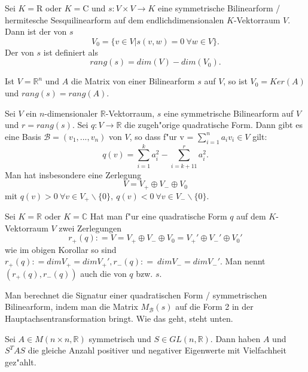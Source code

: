 \documentclass[9pt, a4paper, twocolumn, landscape]{article}
\begin{document}
\begin{definition} Sei $K = \mathrm{R}$ oder $K = \mathrm{C}$ und  $s : V \times V \rightarrow K$ eine symmetrische Bilinearform / hermitesche Sesquilinearform auf dem endlichdimensionalen $K$-Vektorraum $V$. Dann ist der  von $s$ 
$$
V_0 = \{ v \in V | s(v, w) = 0 \ \forall w \in V \}.
$$
Der  von $s$ ist definiert als
$$
rang(s) = dim (V) - dim (V_0).
$$
\end{definition}

\begin{remark} Ist $V = \mathbb{R}^n$ und $A$ die Matrix von einer Bilinearform $s$ auf $V$, so ist $V_0 = Ker(A)$ und $rang(s) = rang(A)$.
\end{remark}

\begin{corollary}
Sei $V$ ein $n$-dimensionaler $\mathbb{R}$-Vektorraum, $s$ eine symmetrische Bilinearform auf $V$ und $r = rang(s)$. Sei $q : V \rightarrow \mathbb{R}$ die zugeh"orige quadratische Form.
Dann gibt es eine Basis $\mathcal{B} = (v_1, ..., v_n)$ von $V$, so dass f"ur v = $\sum\limits_{i=1}^n a_iv_i \in V$ gilt:
$$
q(v) = \sum\limits_{i=1}^k a_i^2 - \sum\limits_{i=k + 11}^r a_i^2.
$$
Man hat insbesondere eine Zerlegung
$$
V = V_+ \oplus V_- \oplus V_0
$$
mit $q(v) > 0 \ \forall v \in V_+ \backslash \{0\}, \ q(v) < 0 \ \forall v \in V_- \backslash \{0\}.$
\end{corollary}

\begin{theorem} 
Sei $K = \mathbb{R}$ oder $K = \mathbb{C}$ Hat man f"ur eine quadratische Form $q$ auf dem $K$-Vektorraum $V$ zwei Zerlegungen 
$$
r_+(q) : = V = V_+ \oplus V_- \oplus V_0 =  V_+' \oplus V_-' \oplus V_0 '
$$
wie im obigen Korollar so sind $r_+(q) : =  dim V_+ = dim V_+ ', r_-(q) : = \ dim V_- = dim V_-'$. Man nennt $(r_+(q), r_-(q))$ auch die  von $q$ bzw. $s$.
\end{theorem}

\begin{remark}
Man berechnet die Signatur einer quadratischen Form / symmetrischen Bilinearform, indem man die Matrix $M_\mathcal{B}(s)$ auf die Form 2 in der Hauptachsentransformation bringt. Wie das geht, steht unten.
\end{remark}


\begin{corollary}
Sei $A \in M(n \times n, \mathbb{R})$ symmetrisch und $S \in GL(n, \mathbb{R})$. Dann haben $A$ und $S^T A S$ die gleiche Anzahl positiver und negativer Eigenwerte mit Vielfachheit gez"ahlt.
\end{corollary}
\end{document}
